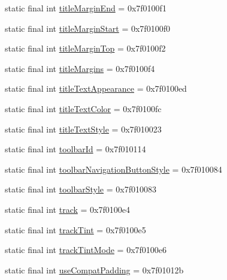 \begin{CompactItemize}
\item 
static final int \hyperlink{classandroid_1_1support_1_1coreutils_1_1_r_1_1attr_ed3941c9c85274f995f7267843f1f3e3}{titleMarginEnd} = 0x7f0100f1
\item 
static final int \hyperlink{classandroid_1_1support_1_1coreutils_1_1_r_1_1attr_f647c1e76bd1c879f0fbc42791d96993}{titleMarginStart} = 0x7f0100f0
\item 
static final int \hyperlink{classandroid_1_1support_1_1coreutils_1_1_r_1_1attr_ebff9af967df4f8d0ab639fb384d2200}{titleMarginTop} = 0x7f0100f2
\item 
static final int \hyperlink{classandroid_1_1support_1_1coreutils_1_1_r_1_1attr_38cc1a395723d7a1c1f30e098e6b4624}{titleMargins} = 0x7f0100f4
\item 
static final int \hyperlink{classandroid_1_1support_1_1coreutils_1_1_r_1_1attr_c3f19e0cd93b0fd279c0ffc3c668775a}{titleTextAppearance} = 0x7f0100ed
\item 
static final int \hyperlink{classandroid_1_1support_1_1coreutils_1_1_r_1_1attr_373e1d379bb1ab1c3df7a328d054c376}{titleTextColor} = 0x7f0100fc
\item 
static final int \hyperlink{classandroid_1_1support_1_1coreutils_1_1_r_1_1attr_2ec5869ea980be6c40bcc51259184de3}{titleTextStyle} = 0x7f010023
\item 
static final int \hyperlink{classandroid_1_1support_1_1coreutils_1_1_r_1_1attr_2c9ac81ec3573f1560c060fa63277f14}{toolbarId} = 0x7f010114
\item 
static final int \hyperlink{classandroid_1_1support_1_1coreutils_1_1_r_1_1attr_0c0b57a985a4b0c56c6b84b9eec8f1fe}{toolbarNavigationButtonStyle} = 0x7f010084
\item 
static final int \hyperlink{classandroid_1_1support_1_1coreutils_1_1_r_1_1attr_8d97bdbc05f27ce64bf781ee5e158db6}{toolbarStyle} = 0x7f010083
\item 
static final int \hyperlink{classandroid_1_1support_1_1coreutils_1_1_r_1_1attr_d50da3e293baa1702a00a4d547f8ea37}{track} = 0x7f0100e4
\item 
static final int \hyperlink{classandroid_1_1support_1_1coreutils_1_1_r_1_1attr_a009dfb1a7fa2c67b2845424cabc7153}{trackTint} = 0x7f0100e5
\item 
static final int \hyperlink{classandroid_1_1support_1_1coreutils_1_1_r_1_1attr_bffb84dbcfa3d2badafa9650ed941747}{trackTintMode} = 0x7f0100e6
\item 
static final int \hyperlink{classandroid_1_1support_1_1coreutils_1_1_r_1_1attr_d6623b05b2509145c64954c3fd548d00}{useCompatPadding} = 0x7f01012b

\end{CompactItemize}
